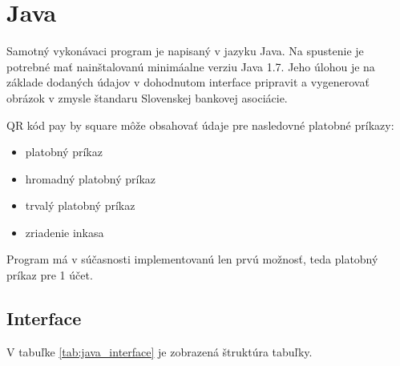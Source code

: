 \chapter{Java}

Samotný vykonávaci program je napisaný v jazyku Java. Na spustenie je potrebné mať nainštalovanú minimáalne verziu Java 1.7.
Jeho úlohou je na základe dodaných údajov v dohodnutom interface pripravit a vygenerovať obrázok v zmysle štandaru Slovenskej bankovej asociácie.

QR kód pay by square môže obsahovať údaje pre nasledovné platobné príkazy:
\begin{itemize}
    \item platobný príkaz
    \item hromadný platobný príkaz
    \item trvalý platobný príkaz
    \item zriadenie inkasa
\end{itemize}

Program má v súčasnosti implementovanú len prvú možnosť, teda platobný príkaz pre 1 účet.

\section{Interface}

V tabuľke \ref{tab:java_interface} je zobrazená štruktúra tabuľky. 

